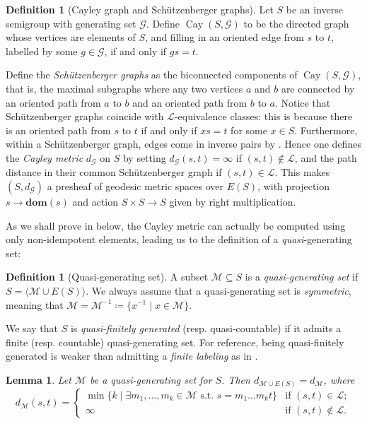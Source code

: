 \documentclass[svgnames]{amsart}
\theoremstyle{plain}
\newtheorem{lem}[thm]{Lemma}
\theoremstyle{definition}
\newtheorem{defn}[thm]{Definition}
\newcommand{\Cay}[2]{\operatorname{Cay}\left(#1,#2\right)}
\newcommand{\dom}[1]{\mathbf{dom}\left(#1\right)}
\begin{document}
\begin{defn}[Cayley graph and Sch\"{u}tzenberger graphs] \label{defn: cayley graph}
    Let $S$ be an inverse semigroup with generating set $\mathcal{G}$. Define
    $\Cay{S}{\mathcal{G}}$ to be the directed graph whose vertices are elements of $S$, 
    and filling in an oriented edge from $s$ to $t$, labelled by some $g \in \mathcal{G}$, if and only if $gs = t$.
    
    Define the \emph{Schützenberger graphs} as the biconnected components of $\Cay{S}{\mathcal{G}}$, that is, the maximal subgraphs where any two vertices $a$ and $b$ are connected by an oriented path from $a$ to $b$ and an oriented path from $b$ to $a$. Notice that Schützenberger graphs coincide with $\mathcal L$-equivalence classes: this is because there is an oriented path from $s$ to $t$ if and only if $xs=t$ for some $x\in S$. Furthermore, within a Schützenberger graph, edges come in inverse pairs by . Hence one defines the \emph{Cayley metric} $d_{\mathcal{G}}$ on $S$ by setting 
    $d_{\mathcal{G}}(s,t)=\infty$ if $(s,t)\not\in \mathcal{L}$, and the path distance in their common Schützenberger graph if $(s,t)\in \mathcal{L}$. This makes $(S,d_{\mathcal{G}})$ a presheaf of geodesic metric spaces over $E(S)$, with projection $s\to\dom{s}$ and action $S\times S\to S$ given by right multiplication.
\end{defn}

\noindent As we shall prove in  below, the Cayley metric can actually be computed using only non-idempotent elements, leading us to the definition of a \emph{quasi}-generating set:
\begin{defn}[Quasi-generating set]
    A subset $\mathcal{M}\subseteq S$ is a \emph{quasi-generating set} if $S=\langle \mathcal{M}\cup E(S)\rangle$. We always assume that a quasi-generating set is \emph{symmetric}, meaning that $\mathcal{M}=\mathcal{M}^{-1}\coloneq\{x^{-1}\mid x\in \mathcal{M}\}$.

    We say that $S$ is \emph{quasi-finitely generated} (resp. quasi-countable) if it admits a finite (resp. countable) quasi-generating set. For reference, being quasi-finitely generated is weaker than admitting a \emph{finite labeling} as in \cite[Definition 3.16]{Uniform_Roe_alg}.
\end{defn}


\begin{lem}\label{lem:cayley_dist_without_idempotents}
    Let $\mathcal M$ be a quasi-generating set for $S$. Then $d_{\mathcal M\cup E(S)}=d_{\mathcal{M}}$, where $$d_{\mathcal{M}}(s,t)=\begin{cases}
        \min\{k\mid \exists m_1,\ldots, m_k\in \mathcal{M} \mbox{ s.t. }s= m_1\ldots m_kt\}&\mbox{if }(s,t)\in \mathcal{L};\\
        \infty &\mbox{if }(s,t)\not\in \mathcal{L}.
    \end{cases}$$
\end{lem}
\end{document}
